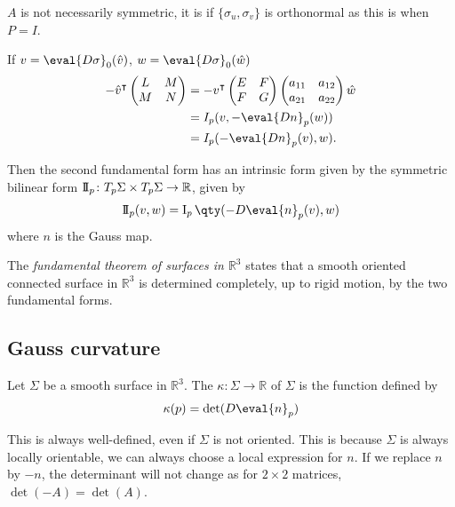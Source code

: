 \begin{note}
	$A$ is not necessarily symmetric, it is if $\{\sigma_u, \sigma_v\}$ is orthonormal as this is when $P = I$.
\end{note}

If $v = \eval{D \sigma}_0(\hat{v})$, $w = \eval{D \sigma}_0(\hat{w})$
\begin{align}
	-\hat{v}^\tran \begin{pmatrix}L & M \\M & N\end{pmatrix} &= - v^\tran \begin{pmatrix}E & F \\F & G\end{pmatrix} \begin{pmatrix}a_{11} & a_{12} \\a_{21} & a_{22}\end{pmatrix} \hat{w} \label{eq:1} \\
	&= I_p(v, - \eval{Dn}_p(w)) \notag \\
	&= I_p(- \eval{Dn}_p(v), w). \notag
\end{align} 

Then the second fundamental form has an intrinsic form given by the symmetric bilinear form $\operatorname{\mathrm{I\!I}}_p \colon T_p \Sigma \times T_p \Sigma \to \mathbb R$, given by
\begin{align*}
	\IIff_p(v,w) = \Iff_p\qty(-D\eval{n}_p(v), w)
\end{align*}
where $n$ is the Gauss map.

\begin{remark}
	The \textit{fundamental theorem of surfaces in $\mathbb R^3$} states that a smooth oriented connected surface in $\mathbb R^3$ is determined completely, up to rigid motion, by the two fundamental forms.
\end{remark}

\subsection{Gauss curvature}
\begin{definition}
	Let $\Sigma$ be a smooth surface in $\mathbb R^3$.
	The  $\kappa \colon \Sigma \to \mathbb R$ of $\Sigma$ is the function defined by
	\begin{align*}
		\kappa(p) = \det(D \eval{n}_p)
	\end{align*}
\end{definition}

\begin{remark}
	This is always well-defined, even if $\Sigma$ is not oriented.
	This is because $\Sigma$ is always locally orientable, we can always choose a local expression for $n$.
	If we replace $n$ by $-n$, the determinant will not change as for $2 \times 2$ matrices, $\det(-A) = \det(A)$.
\end{remark}

